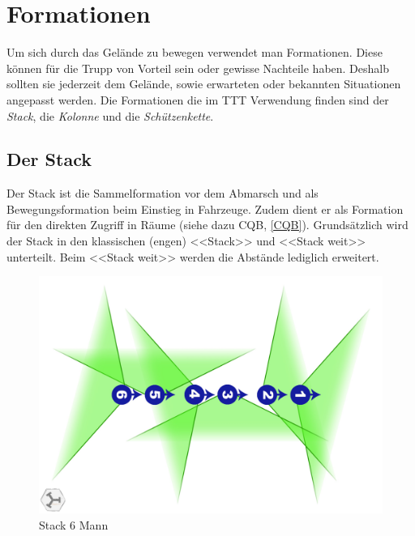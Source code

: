 \section{Formationen}
Um sich durch das Gelände zu bewegen verwendet man Formationen. Diese können für die Trupp von Vorteil sein oder gewisse Nachteile haben. Deshalb sollten sie jederzeit dem Gelände, sowie erwarteten oder bekannten Situationen angepasst werden. Die Formationen die im TTT Verwendung finden sind der \textit{Stack}, die \textit{Kolonne} und die \textit{Schützenkette}. 

\subsection{Der Stack}
Der Stack ist die Sammelformation vor dem Abmarsch und als Bewegungsformation beim Einstieg in Fahrzeuge. Zudem dient er als Formation für den direkten Zugriff in Räume (siehe dazu CQB, \autoref{CQB}). Grundsätzlich wird der Stack in den klassischen (engen) <<Stack>> und <<Stack weit>> unterteilt. Beim <<Stack weit>> werden die Abstände lediglich erweitert.
\begin{figure}[h]
	\centering
	\includegraphics[width=0.7\linewidth]{./img/grundlagen/formationen/stack_6mann.jpg}
	\caption{Stack 6 Mann}
\end{figure}\\


